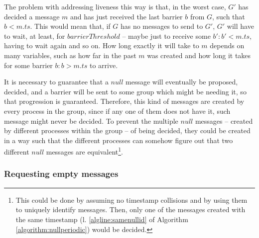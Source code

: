 \documentclass[times, 10pt]{article}
\begin{document}
The problem with addressing liveness this way is that, in the worst case, $G'$ has decided a message $m$ and has just received the last barrier $b$ from $G$, such that $b < m.ts$. This would mean that, if $G$ has no messages to send to $G'$, $G'$ will have to wait, at least, for $barrierThreshold$ -- maybe just to receive some $b' : b' < m.ts$, having to wait again and so on. How long exactly it will take to \cons{} $m$ depends on many variables, such as how far in the past $m$ was created and how long it takes for some barrier $b: b > m.ts$ to arrive.%

It is necessary to guarantee that a $null$ message will eventually be proposed, decided, and a barrier will be sent to some group which might be needing it, so that progression is guaranteed. Therefore, this kind of messages are created by every process in the group, since if any one of them does not have it, such message might never be decided. %
To prevent the multiple $null$ messages -- created by different processes within the group -- of being decided, they could be created in a way such that the different processes can somehow figure out that two different $null$ messages are equivalent\footnote{This could be done by assuming no timestamp collisions and by using them to uniquely identify messages. Then, only one of the messages created with the same timestamp (l. \ref{algline:samenullid} of Algorithm \ref{algorithm:nullperiodic}) would be decided.}.




\subsubsection{Requesting empty messages}
\label{sec:nullondemand}
\end{document}
